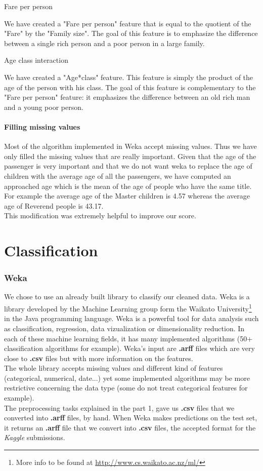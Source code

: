 \documentclass[11pt,a4paper,portrait]{article}
\begin{document}
\subparagraph{Fare per person}
We have created a "Fare per person" feature that is equal to the quotient of the "Fare" by the "Family size". The goal of this feature is to emphasize the difference between a single rich person and a poor person in a large family.

\subparagraph{Age class interaction}
We have created a "Age*class" feature. This feature is simply the product of the age of the person with his class. The goal of this feature is complementary to the "Fare per person" feature: it emphasizes the difference between an old rich man and a young poor person.


\subsection{Filling missing values}
Most of the algorithm implemented in Weka accept missing values. Thus we have only filled the missing values that are really important. Given that the age of the passenger is very important and that we do not want weka to replace the age of children with the average age of all the passengers, we have computed an approached age which is the mean of the age of people who have the same title. For example the average age of the Master children is 4.57 whereas the average age of Reverend people is 43.17.\\
This modification was extremely helpful to improve our score.


\part{Classification}
\setcounter{section}{0}

\section{Weka}
We chose to use an already built library to classify our cleaned data. Weka is a library developed by the Machine Learning group form the Waikato University\footnote{More info to be found at \url{http://www.cs.waikato.ac.nz/ml/}} in the Java programming language. Weka is a powerful tool for data analysis such as classification, regression, data vizualization or dimensionality reduction. In each of these machine learning fields, it has many implemented algorithms (50+ classification algorithms for example). Weka's input are \textbf{.arff} files which are very close to \textbf{.csv} files but with more information on the features.\\
The whole library accepts missing values and different kind of features (categorical, numerical, date...) yet some implemented algorithms may be more restrictive concerning the data type (some do not treat categorical features for example).\\
The preprocessing tasks explained in the part 1, gave us \textbf{.csv} files that we converted into \textbf{.arff} files, by hand. When Weka makes predictions on the test set, it returns an \textbf{.arff} file that we convert into \textbf{.csv} files, the accepted format for the \textit{Kaggle} submissions.
\end{document}
